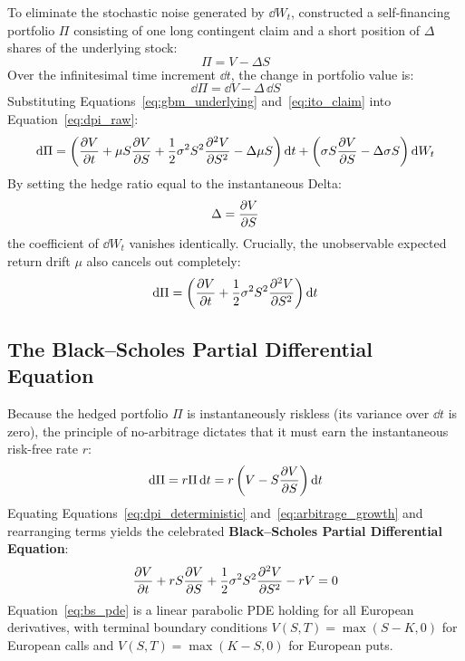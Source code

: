To eliminate the stochastic noise generated by $\dd W_t$, \citet{black1973pricing} constructed a self-financing portfolio $\Pi$ consisting of one long contingent claim and a short position of $\Delta$ shares of the underlying stock:
\begin{equation}
    \Pi = V - \Delta S
    \label{eq:hedged_portfolio}
\end{equation}
Over the infinitesimal time increment $\dd t$, the change in portfolio value is:
\begin{equation}
    \dd \Pi = \dd V - \Delta \, \dd S
    \label{eq:dpi_raw}
\end{equation}
Substituting Equations~\eqref{eq:gbm_underlying} and~\eqref{eq:ito_claim} into Equation~\eqref{eq:dpi_raw}:
\begin{equation}
    \mathrm{d} \Pi = \left( \frac{\partial V}{\partial t} + \mu S \frac{\partial V}{\partial S} + \frac{1}{2}\sigma^2 S^2 \frac{\partial^2 V}{\partial S^2} - \Delta \mu S \right) \mathrm{d} t + \left( \sigma S \frac{\partial V}{\partial S} - \Delta \sigma S \right) \mathrm{d} W_t
    \label{eq:dpi_grouped}
\end{equation}
By setting the hedge ratio equal to the instantaneous Delta:
\begin{equation}
    \Delta = \frac{\partial V}{\partial S}
    \label{eq:delta_choice}
\end{equation}
the coefficient of $\dd W_t$ vanishes identically. Crucially, the unobservable expected return drift $\mu$ also cancels out completely:
\begin{equation}
    \mathrm{d} \Pi = \left( \frac{\partial V}{\partial t} + \frac{1}{2}\sigma^2 S^2 \frac{\partial^2 V}{\partial S^2} \right) \mathrm{d} t
    \label{eq:dpi_deterministic}
\end{equation}

\subsection{The Black--Scholes Partial Differential Equation}

Because the hedged portfolio $\Pi$ is instantaneously riskless (its variance over $\dd t$ is zero), the principle of no-arbitrage dictates that it must earn the instantaneous risk-free rate $r$:
\begin{equation}
    \mathrm{d} \Pi = r \Pi \, \mathrm{d} t = r \left( V - S \frac{\partial V}{\partial S} \right) \mathrm{d} t
    \label{eq:arbitrage_growth}
\end{equation}
Equating Equations~\eqref{eq:dpi_deterministic} and~\eqref{eq:arbitrage_growth} and rearranging terms yields the celebrated \textbf{Black--Scholes Partial Differential Equation}:
\begin{equation}
    \frac{\partial V}{\partial t} + r S \frac{\partial V}{\partial S} + \frac{1}{2}\sigma^2 S^2 \frac{\partial^2 V}{\partial S^2} - r V = 0
    \label{eq:bs_pde}
\end{equation}
Equation~\eqref{eq:bs_pde} is a linear parabolic PDE holding for all European derivatives, with terminal boundary conditions $V(S, T) = \max(S - K, 0)$ for European calls and $V(S, T) = \max(K - S, 0)$ for European puts.

\clearpage
